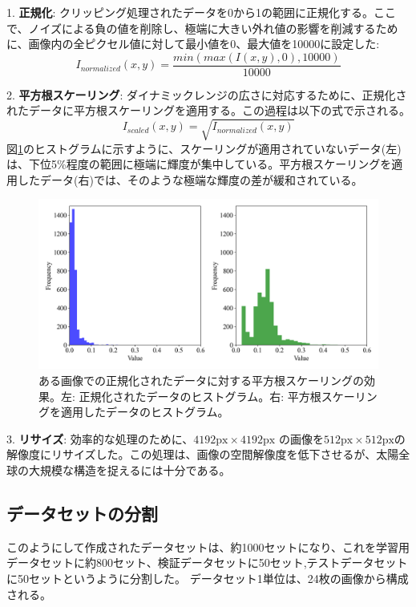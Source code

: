     1. \textbf{正規化}: クリッピング処理されたデータを0から1の範囲に正規化する。ここで、ノイズによる負の値を削除し、極端に大きい外れ値の影響を削減するために、画像内の全ピクセル値に対して最小値を0、最大値を10000に設定した:
       \begin{equation}
       I_{normalized}(x, y) = \frac{min(max(I(x,y), 0), 10000)}{10000}
       \end{equation}

    2. \textbf{平方根スケーリング}: ダイナミックレンジの広さに対応するために、正規化されたデータに平方根スケーリングを適用する。この過程は以下の式で示される。
       \begin{equation}
       I_{scaled}(x, y) = \sqrt{I_{normalized}(x, y)}
       \end{equation}
        図\ref{fig:scale_histogram}のヒストグラムに示すように、スケーリングが適用されていないデータ(左)は、下位5\%程度の範囲に極端に輝度が集中している。平方根スケーリングを適用したデータ(右)では、そのような極端な輝度の差が緩和されている。

    \begin{figure}[htbp]
        \centering
        \includegraphics[width=\linewidth]{figures/data/histogram.png}
        \caption{ある画像での正規化されたデータに対する平方根スケーリングの効果。左: 正規化されたデータのヒストグラム。右: 平方根スケーリングを適用したデータのヒストグラム。}
        \label{fig:scale_histogram}
    \end{figure}

    3. \textbf{リサイズ}: 効率的な処理のために、$4192\text{px} \times 4192\text{px}$ の画像を$512\text{px} \times 512\text{px}$の解像度にリサイズした。この処理は、画像の空間解像度を低下させるが、太陽全球の大規模な構造を捉えるには十分である。


\subsection{データセットの分割}
このようにして作成されたデータセットは、約1000セットになり、これを学習用データセットに約800セット、検証データセットに50セット,テストデータセットに50セットというように分割した。
データセット1単位は、24枚の画像から構成される。

